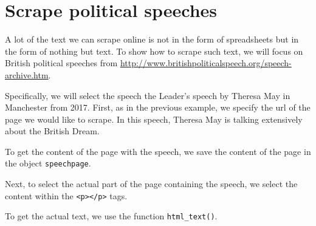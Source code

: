 \documentclass[12pt,oneside]{reedthesis}
\theoremstyle{definition}
\theoremstyle{definition}
\theoremstyle{definition}
\theoremstyle{remark}
\begin{document}
  \section{Scrape political speeches}\label{scrape-political-speeches}
  
  A lot of the text we can scrape online is not in the form of
  spreadsheets but in the form of nothing but text. To show how to scrape
  such text, we will focus on British political speeches from
  \url{http://www.britishpoliticalspeech.org/speech-archive.htm}.
  
  Specifically, we will select the speech the Leader's speech by Theresa
  May in Manchester from 2017. First, as in the previous example, we
  specify the url of the page we would like to scrape. In this speech,
  Theresa May is talking extensively about the British Dream.
  \begin{Shaded}
  \begin{Highlighting}[]
  \StringTok{ }\NormalTok{(}
  \NormalTok{  )}
  \end{Highlighting}
  \end{Shaded}
  To get the content of the page with the speech, we save the content of
  the page in the object \texttt{speechpage}.
  \begin{Shaded}
  \begin{Highlighting}[]
  \StringTok{ }
  \end{Highlighting}
  \end{Shaded}
  Next, to select the actual part of the page containing the speech, we
  select the content within the
  \texttt{\textless{}p\textgreater{}\textless{}/p\textgreater{}} tags.
  \begin{Shaded}
  \begin{Highlighting}[]
  \StringTok{ }\NormalTok{)}
  \end{Highlighting}
  \end{Shaded}
  To get the actual text, we use the function \texttt{html\_text()}.
  \begin{Shaded}
  \begin{Highlighting}[]
  \StringTok{ }
  \end{Highlighting}
  \end{Shaded}
\end{document}
